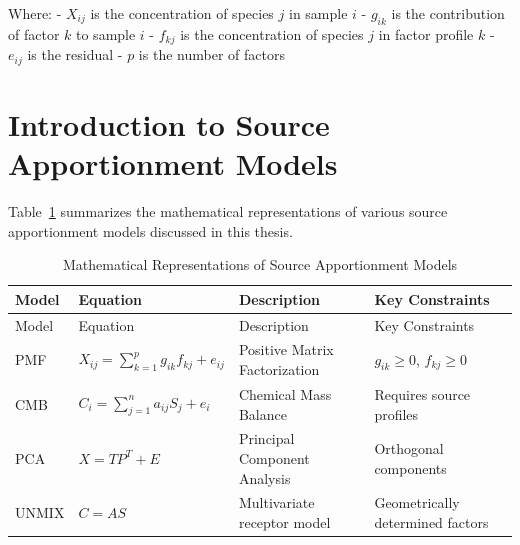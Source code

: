 \documentclass[
  letterpaper,
  oneside,
  openany]{MastersDoctoralThesis}
\theoremstyle{plain}
\theoremstyle{remark}
\begin{document}
Where: - \(X_{ij}\) is the concentration of species \(j\) in sample
\(i\) - \(g_{ik}\) is the contribution of factor \(k\) to sample \(i\) -
\(f_{kj}\) is the concentration of species \(j\) in factor profile \(k\)
- \(e_{ij}\) is the residual - \(p\) is the number of factors

\section{Introduction to Source Apportionment
Models}\label{sec-ch1-intro-models}

Table~\ref{tbl-intro-equations} summarizes the mathematical
representations of various source apportionment models discussed in this
thesis.

\begin{longtable}[]{@{}
  >{\raggedright\arraybackslash}p{}
  >{\raggedright\arraybackslash}p{}
  >{\raggedright\arraybackslash}p{}
  >{\raggedright\arraybackslash}p{}@{}}
\caption{Mathematical Representations of Source Apportionment
Models}\label{tbl-intro-equations}\tabularnewline
\toprule\noalign{}
\begin{minipage}[b]{\linewidth}\raggedright
Model
\end{minipage} & \begin{minipage}[b]{\linewidth}\raggedright
Equation
\end{minipage} & \begin{minipage}[b]{\linewidth}\raggedright
Description
\end{minipage} & \begin{minipage}[b]{\linewidth}\raggedright
Key Constraints
\end{minipage} \\
\midrule\noalign{}
\endfirsthead
\toprule\noalign{}
\begin{minipage}[b]{\linewidth}\raggedright
Model
\end{minipage} & \begin{minipage}[b]{\linewidth}\raggedright
Equation
\end{minipage} & \begin{minipage}[b]{\linewidth}\raggedright
Description
\end{minipage} & \begin{minipage}[b]{\linewidth}\raggedright
Key Constraints
\end{minipage} \\
\midrule\noalign{}
\endhead
\bottomrule\noalign{}
\endlastfoot
PMF & \(X_{ij} = \sum_{k=1}^{p} g_{ik}f_{kj} + e_{ij}\) & Positive
Matrix Factorization & \(g_{ik} \geq 0\), \(f_{kj} \geq 0\) \\
CMB & \(C_i = \sum_{j=1}^{n} a_{ij} S_{j} + e_i\) & Chemical Mass
Balance & Requires source profiles \\
PCA & \(X = TP^T + E\) & Principal Component Analysis & Orthogonal
components \\
UNMIX & \(C = AS\) & Multivariate receptor model & Geometrically
determined factors \\
\end{longtable}
\end{document}
